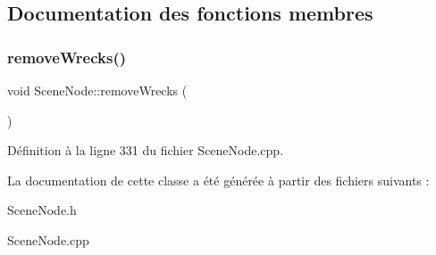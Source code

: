 \subsection{Documentation des fonctions membres}
\hypertarget{class_scene_node_a4ab07dfa68f4094e2e9152b6f4869794}{}\label{class_scene_node_a4ab07dfa68f4094e2e9152b6f4869794} 
\subsubsection{\texorpdfstring{remove\+Wrecks()}{removeWrecks()}}
{\footnotesize\ttfamily void Scene\+Node\+::remove\+Wrecks (\begin{DoxyParamCaption}{ }\end{DoxyParamCaption})}


\begin{DoxyItemize}
\item 
\end{DoxyItemize}

Définition à la ligne 331 du fichier Scene\+Node.\+cpp.



La documentation de cette classe a été générée à partir des fichiers suivants \+:\begin{DoxyCompactItemize}
\item 
Scene\+Node.\+h\item 
Scene\+Node.\+cpp\end{DoxyCompactItemize}
